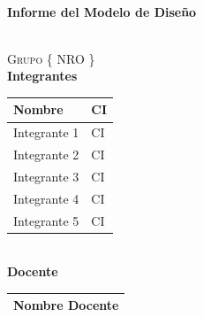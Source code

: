 \documentclass[10pt,spanish]{article}
\newcommand{\Titulo}{Informe del Modelo de Diseño}
\newcommand{\Grupo}{Grupo \{ NRO \}}
\newcommand{\NomIntegrUno}{Integrante 1}
\newcommand{\CiIntegrUno}{CI}
\newcommand{\NomIntegrDos}{Integrante 2}
\newcommand{\CiIntegrDos}{CI}
\newcommand{\NomIntegrTres}{Integrante 3}
\newcommand{\CiIntegrTres}{CI}
\newcommand{\NomIntegrCuatro}{Integrante 4}
\newcommand{\CiIntegrCuatro}{CI}
\newcommand{\NomIntegrCinco}{Integrante 5}
\newcommand{\CiIntegrCinco}{CI}
\newcommand{\NomDocente}{Nombre Docente}
\numberwithin{figure}{section} %
\begin{document}
\begin{center}
\vspace*{1cm}																		%
\HRule \\[0.4cm]																	%
{ \huge \bfseries \Titulo}\\[0.3cm]	%
\HRule \\[4cm]																	%
\begin{minipage}{0.8\textwidth}													%
\begin{flushleft} \large															%
\textsc{\LARGE \Grupo}\\
\LARGE{\textbf{Integrantes}}\\	
\Large
\vspace{0.3cm}
  \begin{tabular}{ | p{10cm} | p{2.5cm} | }
    \hline
    \textbf{Nombre} & \textbf{CI} \\ \hline
    \NomIntegrUno & \CiIntegrUno \\ \hline
    \NomIntegrDos & \CiIntegrDos  \\ \hline 
    \NomIntegrTres & \CiIntegrTres \\ \hline
    \NomIntegrCuatro & \CiIntegrCuatro \\ \hline
    \NomIntegrCinco & \CiIntegrCinco \\ \hline
  \end{tabular}\\[0.5cm]
\LARGE{\textbf{Docente}}\\	
\Large
\vspace{0.3cm}
\begin{tabular}{ | p{10cm} |}
    \hline
     \NomDocente \\ 
     \hline
  \end{tabular}
\end{flushleft}																		%
\end{minipage}		
\begin{minipage}{0.52\textwidth}		
\vspace{-0.6cm}											%
\begin{flushright} \large															%
\emph{} \\																	%
\end{flushright}																	%
\end{minipage}	
\begin{flushleft}
 	
\end{flushleft}
 		\flushleft{\textbf{}	}\\																		%
\end{center}							 											
																					
\end{document}
